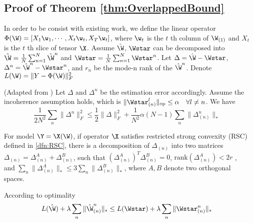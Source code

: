 \subsection*{Proof of Theorem \ref{thm:OverlappedBound}  }
In order to be consist with existing work, we define the linear operator $\Phi(\W)= [X_1\w_1, \cdots, X_t\w_t, X_T\w_t]$, where $\w_t$ is the $t$ th column of $\W_{(1)}$ and $X_t$ is the $t$ th slice of tensor $\X$.
\setcounter{equation}{0}
Assume $\hat{\W}$, $\Wstar $ can be decomposed into $\hat{\W}= \frac{1}{N} \sum_{n=1}^N\hat{\W}^n $ and $\Wstar =  \frac{1}{N} \sum_{n=1}^N\Wstar^n$. Let $\Delta = \hat{\W}-\Wstar $, $\Delta^n  = \hat{\W}^n - \Wstar^n$, and $r_n$ be the mode-n  rank of the $\hat{\W}^n$.  Denote
 $L(\W) = \| Y- \Phi(\W)\|_F^2$
 
\begin{lemma} (Adapted from  \cite{tomioka2010estimation} )
\label{lma:lowerbound}
Let $\Delta$ and $\Delta^n$ be the estimation error accordingly. Assume the incoherence assumption holds, which is $\|\Wstar^l_{(n)}\|_{\text{op}} \leq \alpha \quad \forall l\neq n $. We have
\begin{equation*}
\frac{1}{2N^2}\sum_n \|\Delta^n\|_F^2 \leq \frac{1}{2}\|\Delta\|^2_F +\frac{1}{N^2} \alpha (N-1)\sum_n \|\Delta_{(n)}^n\|_*
\end{equation*}
\end{lemma}

\begin{lemma} \cite{agarwal2012noisy}
\label{lma:decomposition}
For model  $\Y = \X(\W )$, if operator $\X$ satisfies restricted strong convexity (RSC) defined in \ref{dfn:RSC}, there is a decomposition of $\Delta_{(n)}$ into two matrices $\Delta_{(n)}= \Delta^A_{(n)} + \Delta^B_{(n)}$, such that $(\Delta^{A}_{(n)})^T \Delta^B_{(n)} =0$, $\mathrm{rank}(\Delta^A_{(n)}) < 2r$ , and $\sum\limits_n \|\Delta^A_{(n)}\|_* \leq 3 \sum\limits_n \|\Delta^B_{(n)}\|_*$, where $A,B$ denote two orthogonal spaces.
\end{lemma}





According to optimality
\begin{equation}
\label{eqn:optimality}
L(\hat{\W}) +\lambda\sum\limits_n \|\hat{\W}^n_{(n)}\|_* \leq L(\Wstar) +\lambda\sum\limits_n \|\Wstar^{n}_{(n)}\|_*
\end{equation}

